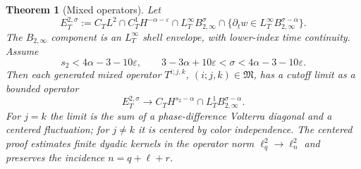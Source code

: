 \documentclass[10pt]{amsart}
\numberwithin{equation}{section}
\theoremstyle{plain}
\newtheorem{theorem}{Theorem}[section]
\theoremstyle{definition}
\theoremstyle{remark}
\newcommand{\eps}{\varepsilon}
\begin{document}
\begin{theorem}[Mixed operators]\label{thm:operator-main}
Let
\begin{equation}\label{eq:ET-def-intro}
        E_T^{2,\sigma}:=C_TL^2\cap C_T^1H^{-\alpha-\eps}
        \cap L_T^\infty B_{2,\infty}^{\sigma}
        \cap\{\partial_t w\in L_T^\infty B_{2,\infty}^{\sigma-\alpha}\}.
\end{equation}
The $B_{2,\infty}$ component is an $L_T^\infty$ shell envelope, with lower-index time continuity.  Assume
\begin{equation}\label{eq:operator-cond-main}
        s_2<4\alpha-3-10\eps,
        \qquad
        3-3\alpha+10\eps<\sigma<4\alpha-3-10\eps.
\end{equation}
Then each generated mixed operator $T^{i;j,k}$, $(i;j,k)\in\mathfrak M$, has a cutoff limit as a bounded operator
\begin{equation}\label{eq:operator-bound-main}
        E_T^{2,\sigma}\to C_TH^{s_2-\alpha}\cap L_T^1B_{2,\infty}^{\sigma-\alpha}.
\end{equation}
For $j=k$ the limit is the sum of a phase-difference Volterra diagonal and a centered fluctuation; for $j\ne k$ it is centered by color independence.  The centered proof estimates finite dyadic kernels in the operator norm $\ell_q^2\to\ell_n^2$ and preserves the incidence $n=q+\ell+r$.
\end{theorem}
\end{document}
